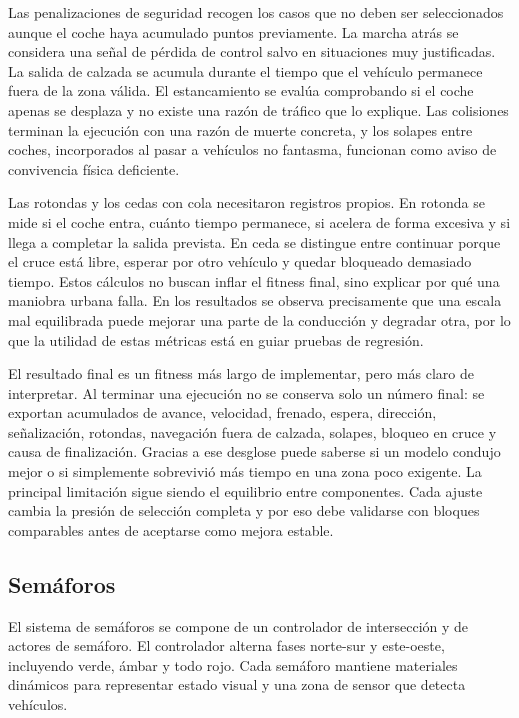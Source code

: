 Las penalizaciones de seguridad recogen los casos que no deben ser seleccionados aunque el coche haya acumulado puntos previamente. La marcha atrás se considera una señal de pérdida de control salvo en situaciones muy justificadas. La salida de calzada se acumula durante el tiempo que el vehículo permanece fuera de la zona válida. El estancamiento se evalúa comprobando si el coche apenas se desplaza y no existe una razón de tráfico que lo explique. Las colisiones terminan la ejecución con una razón de muerte concreta, y los solapes entre coches, incorporados al pasar a vehículos no fantasma, funcionan como aviso de convivencia física deficiente.

Las rotondas y los cedas con cola necesitaron registros propios. En rotonda se mide si el coche entra, cuánto tiempo permanece, si acelera de forma excesiva y si llega a completar la salida prevista. En ceda se distingue entre continuar porque el cruce está libre, esperar por otro vehículo y quedar bloqueado demasiado tiempo. Estos cálculos no buscan inflar el fitness final, sino explicar por qué una maniobra urbana falla. En los resultados se observa precisamente que una escala mal equilibrada puede mejorar una parte de la conducción y degradar otra, por lo que la utilidad de estas métricas está en guiar pruebas de regresión.

El resultado final es un fitness más largo de implementar, pero más claro de interpretar. Al terminar una ejecución no se conserva solo un número final: se exportan acumulados de avance, velocidad, frenado, espera, dirección, señalización, rotondas, navegación fuera de calzada, solapes, bloqueo en cruce y causa de finalización. Gracias a ese desglose puede saberse si un modelo condujo mejor o si simplemente sobrevivió más tiempo en una zona poco exigente. La principal limitación sigue siendo el equilibrio entre componentes. Cada ajuste cambia la presión de selección completa y por eso debe validarse con bloques comparables antes de aceptarse como mejora estable.

\subsection{Semáforos}

El sistema de semáforos se compone de un controlador de intersección y de actores de semáforo. El controlador alterna fases norte-sur y este-oeste, incluyendo verde, ámbar y todo rojo. Cada semáforo mantiene materiales dinámicos para representar estado visual y una zona de sensor que detecta vehículos.

